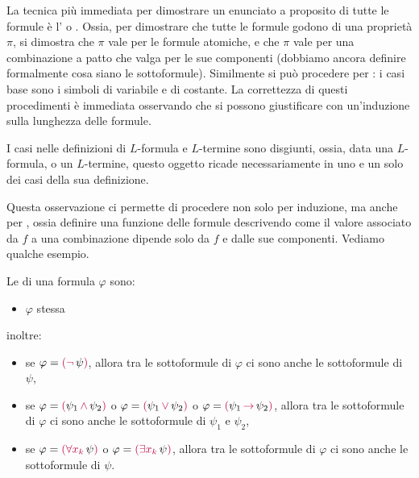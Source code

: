 La tecnica più immediata per dimostrare un enunciato a proposito di tutte le formule è l' o . Ossia, per dimostrare che tutte le formule godono di una proprietà $\pi$,
si dimostra che $\pi$ vale per le formule atomiche, e che $\pi$ vale per una combinazione a patto che valga per le sue componenti (dobbiamo ancora definire formalmente cosa siano le sottoformule).
Similmente si può procedere per : i casi base sono i simboli di variabile e di costante.
La correttezza di questi procedimenti è immediata osservando che si possono giustificare con un'induzione sulla lunghezza delle formule.

\begin{remark}
   I casi nelle definizioni di $L$-formula e $L$-termine sono disgiunti, ossia, data una $L$-formula, o un $L$-termine, questo oggetto ricade necessariamente in uno e un solo dei casi della sua definizione.
\end{remark}

Questa osservazione ci permette di procedere non solo per induzione, ma anche per , ossia definire una funzione delle formule descrivendo come il valore associato da $f$ a una combinazione
dipende solo da $f$ e dalle sue componenti. Vediamo qualche esempio.

\begin{definition}
    [Sottoformula]
    Le  di una formula $\varphi$ sono:
    \begin{itemize}
        \item $\varphi$ stessa
    \end{itemize}
    inoltre:
    \begin{itemize}
        \item se $\varphi = \textcolor{purple}{(\neg}\, \psi \textcolor{purple}{)}$, allora tra le sottoformule di $\varphi$ ci sono anche le sottoformule di $\psi$,
        \item se $\varphi = \textcolor{purple}{(} \psi_1 \,\textcolor{purple}{\land} \,\psi_2 \textcolor{purple}{)}$ o $\varphi = \textcolor{purple}{(} \psi_1\, \textcolor{purple}{\lor}\, \psi_2 \textcolor{purple}{)}$ o
        $\varphi = \textcolor{purple}{(} \psi_1\, \textcolor{purple}{\to} \,\psi_2 \textcolor{purple}{)}$, allora tra le sottoformule di $\varphi$ ci sono anche le sottoformule di $\psi_1$ e $\psi_2$,
        \item se $\varphi = \textcolor{purple}{(\forall x_k} \,\psi \textcolor{purple}{)}$ o $\varphi = \textcolor{purple}{(\exists x_k}\, \psi \textcolor{purple}{)}$, allora tra le sottoformule di $\varphi$ ci sono anche le sottoformule di $\psi$.
    \end{itemize}
\end{definition}

